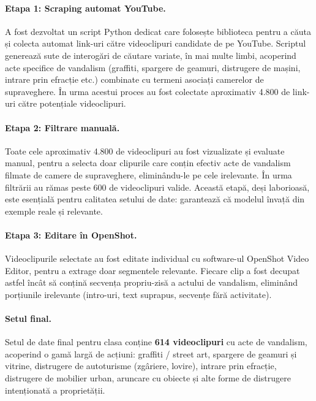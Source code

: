 \documentclass[../../main.tex]{subfiles}
\begin{document}
\paragraph{Etapa 1: Scraping automat YouTube.}
\label{par:scraping_youtube}
A fost dezvoltat un script Python dedicat care folosește biblioteca  pentru a
căuta și colecta automat link-uri către videoclipuri candidate de pe YouTube. Scriptul generează
sute de interogări de căutare variate, în mai multe limbi, acoperind acte specifice de vandalism
(graffiti, spargere de geamuri, distrugere de mașini, intrare prin efracție etc.) combinate cu
termeni asociați camerelor de supraveghere. În urma acestui proces au fost colectate aproximativ
4.800 de link-uri către potențiale videoclipuri.

\paragraph{Etapa 2: Filtrare manuală.}
\label{par:filtrare_manuala}
Toate cele aproximativ 4.800 de videoclipuri au fost vizualizate și evaluate manual, pentru a
selecta doar clipurile care conțin efectiv acte de vandalism filmate de camere de supraveghere,
eliminându-le pe cele irelevante. În urma filtrării au rămas peste 600 de videoclipuri valide.
Această etapă, deși laborioasă, este esențială pentru calitatea setului de date: garantează că modelul
învață din exemple reale și relevante.

\paragraph{Etapa 3: Editare în OpenShot.}
\label{par:editare_openshot}
Videoclipurile selectate au fost editate individual cu software-ul OpenShot Video Editor, pentru
a extrage doar segmentele relevante. Fiecare clip a fost decupat astfel încât să conțină secvența
propriu-zisă a actului de vandalism, eliminând porțiunile irelevante (intro-uri, text suprapus,
secvențe fără activitate).

\paragraph{Setul final.}
\label{par:set_final}
Setul de date final pentru clasa  conține \textbf{614 videoclipuri} cu acte
de vandalism, acoperind o gamă largă de acțiuni: graffiti / street art, spargere de geamuri și
vitrine, distrugere de autoturisme (zgâriere, lovire), intrare prin efracție, distrugere de
mobilier urban, aruncare cu obiecte și alte forme de distrugere intenționată a proprietății.
\end{document}
